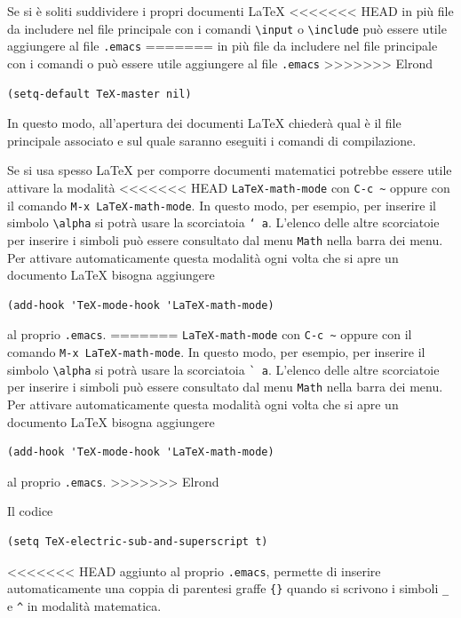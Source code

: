 \documentclass[11pt,a4paper]{article}
\begin{document}
Se si è soliti suddividere i propri documenti \LaTeX{}
<<<<<<< HEAD
in più file da includere nel file principale con i comandi
\texttt{\textbackslash{}input} o \texttt{\textbackslash{}include} può essere
utile aggiungere al file \texttt{.emacs}
=======
in più file da includere nel file principale con i comandi \verb!! o
\verb!! può essere utile aggiungere al file \verb!.emacs!
>>>>>>> Elrond
\begin{Verbatim}
(setq-default TeX-master nil)
\end{Verbatim}
In questo modo, all'apertura dei documenti \LaTeX{}
\emacs{}
chiederà qual è il file principale associato e sul quale saranno eseguiti i
comandi di compilazione.

Se si usa spesso \LaTeX{}
per comporre documenti matematici potrebbe essere utile attivare la modalità
<<<<<<< HEAD
\texttt{LaTeX-math-mode} con \texttt{C-c \textasciitilde} oppure con il comando
\texttt{M-x LaTeX-math-mode}.  In questo modo, per esempio, per inserire il
simbolo \texttt{\textbackslash{}alpha} si potrà usare la scorciatoia
\texttt{` a}.  L'elenco delle altre scorciatoie per inserire i simboli può
essere consultato dal menu \texttt{Math} nella barra dei menu.  Per attivare
automaticamente questa modalità ogni volta che si apre un documento \LaTeX{}
bisogna aggiungere
\begin{Verbatim}
(add-hook 'TeX-mode-hook 'LaTeX-math-mode)
\end{Verbatim}
al proprio \texttt{.emacs}.
=======
\verb!LaTeX-math-mode! con \verb!C-c ~! oppure con il comando
\verb!M-x LaTeX-math-mode!.  In questo modo, per esempio, per inserire il
simbolo \verb!\alpha! si potrà usare la scorciatoia \verb!` a!.  L'elenco delle
altre scorciatoie per inserire i simboli può essere consultato dal menu
\verb!Math! nella barra dei menu.  Per attivare automaticamente questa modalità
ogni volta che si apre un documento \LaTeX{} bisogna aggiungere
\begin{Verbatim}
(add-hook 'TeX-mode-hook 'LaTeX-math-mode)
\end{Verbatim}
al proprio \verb!.emacs!.
>>>>>>> Elrond

Il codice
\begin{Verbatim}
(setq TeX-electric-sub-and-superscript t)
\end{Verbatim}
<<<<<<< HEAD
aggiunto al proprio \texttt{.emacs}, permette di inserire automaticamente una
coppia di parentesi graffe \texttt{\{\}} quando si scrivono i simboli
\texttt{\_} e \texttt{\textasciicircum} in modalità matematica.
\end{document}
